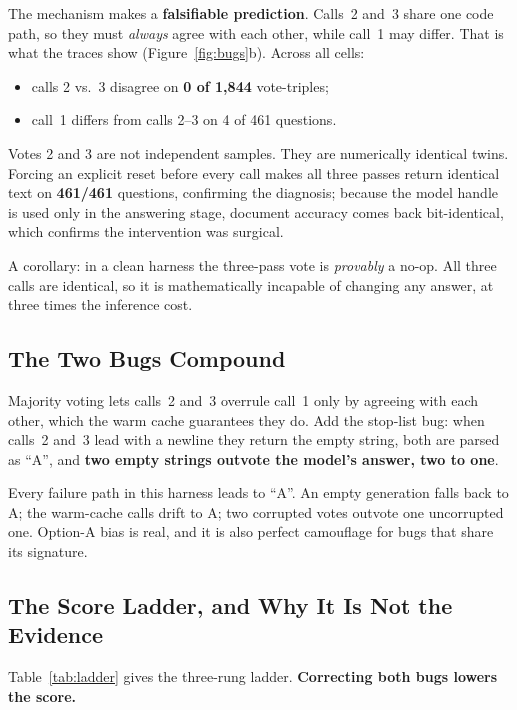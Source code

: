 \documentclass{article}
\begin{document}
The mechanism makes a \textbf{falsifiable prediction}. Calls~2 and~3 share one code path, so they must \emph{always} agree with each other, while call~1 may differ. That is what the traces show (Figure~\ref{fig:bugs}b). Across all cells:

\begin{itemize}
\itemsep=0pt
\item calls 2 vs.\ 3 disagree on \textbf{0 of 1,844} vote-triples;
\item call~1 differs from calls 2--3 on 4 of 461 questions.
\end{itemize}

Votes 2 and 3 are not independent samples. They are numerically identical twins. Forcing an explicit reset before every call makes all three passes return identical text on \textbf{461/461} questions, confirming the diagnosis; because the model handle is used only in the answering stage, document accuracy comes back bit-identical, which confirms the intervention was surgical.

A corollary: in a clean harness the three-pass vote is \emph{provably} a no-op. All three calls are identical, so it is mathematically incapable of changing any answer, at three times the inference cost.

\subsection{The Two Bugs Compound}

Majority voting lets calls~2 and~3 overrule call~1 only by agreeing with each other, which the warm cache guarantees they do. Add the stop-list bug: when calls~2 and~3 lead with a newline they return the empty string, both are parsed as ``A'', and \textbf{two empty strings outvote the model's answer, two to one}.

Every failure path in this harness leads to ``A''. An empty generation falls back to A; the warm-cache calls drift to A; two corrupted votes outvote one uncorrupted one. Option-A bias is real, and it is also perfect camouflage for bugs that share its signature.

\subsection{The Score Ladder, and Why It Is Not the Evidence}
\label{sec:ladder}

Table~\ref{tab:ladder} gives the three-rung ladder. \textbf{Correcting both bugs lowers the score.}
\end{document}
